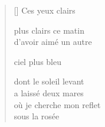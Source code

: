 \documentclass[11pt,a4paper]{article}
\begin{document}
\thispagestyle{empty}


\settowidth{\versewidth}{où je cherche mon reflet}

\bigskip

\begin{verse}[\versewidth]
  Ces yeux clairs

  plus clairs ce matin \\
  d'avoir aimé un autre

  ciel plus bleu

  dont le soleil levant \\
  a laissé deux mares \\
  où je cherche mon reflet \\
  sous la rosée
\end{verse}
\end{document}
